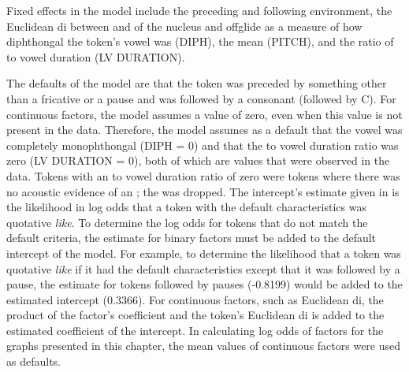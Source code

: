 Fixed effects in the model include the preceding and following environment, the Euclidean di between  and  of the nucleus and offglide as a measure of how diphthongal the token's vowel was (DIPH), the mean  (PITCH), and the ratio of  to vowel duration (LV DURATION). 
 
The defaults of the model are that the token was preceded by something other than a fricative or a pause and was followed by a consonant (followed by C). For continuous factors, the model assumes a value of zero, even when this value is not present in the data. Therefore, the model assumes as a default that the vowel was completely monophthongal (DIPH = 0) and that the  to vowel duration ratio was zero (LV DURATION = 0), both of which are values that were observed in the data. Tokens with an  to vowel duration ratio of zero were tokens where there was no acoustic evidence of an ; the  was dropped. The intercept's estimate given in  is the likelihood in log odds that a token with the default characteristics was quotative \textit{like}. To determine the log odds for tokens that do not match the default criteria, the estimate for binary factors must be added to the default intercept of the model. For example, to determine the likelihood that a token was quotative \textit{like} if it had the default characteristics except that it was followed by a pause, the estimate for tokens followed by pauses (-0.8199) would be added to the estimated intercept (0.3366). For continuous factors, such as Euclidean di, the product of the factor's coefficient and the token's Euclidean di is added to the estimated coefficient of the intercept. In calculating log odds of factors for the graphs presented in this chapter, the mean values of continuous factors were used as defaults.

